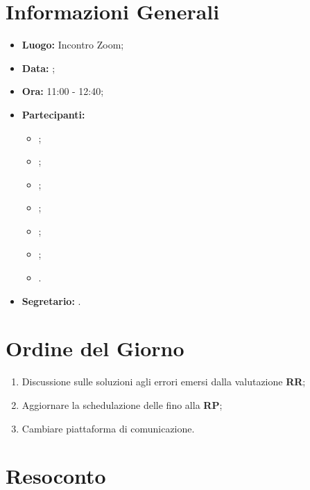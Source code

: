 \section{Informazioni Generali}
\begin{itemize}
\item \textbf{Luogo:} Incontro Zoom;
\item \textbf{Data:} \Data;
\item \textbf{Ora:} 11:00 - 12:40;
\item \textbf{Partecipanti:}
	\begin{itemize}
		\item \BL{}; 
		\item \FF{};
		\item \MM{}; 
		\item \PC{};
		\item \TG{};
		\item \TL{};
		\item \VD{}.
	\end{itemize} 
\item \textbf{Segretario:} \TL{}.
\end{itemize}

\section{Ordine del Giorno}
\begin{enumerate}
 \item Discussione sulle soluzioni agli errori emersi dalla valutazione \textbf{RR};
 \item Aggiornare la schedulazione delle  fino alla \textbf{RP};
 \item Cambiare piattaforma di comunicazione.
\end{enumerate}

\section{Resoconto}
